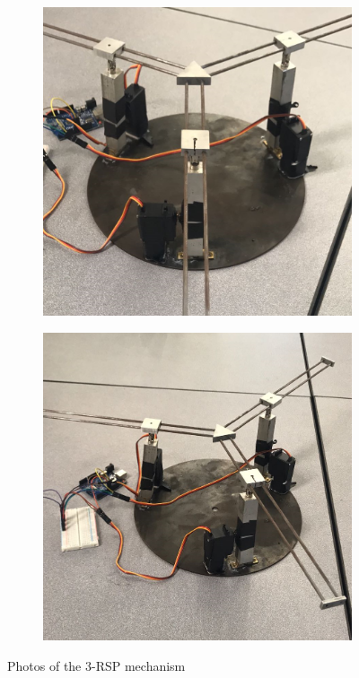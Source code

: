 \documentclass[titlepage, letterpaper]{article}
\begin{document}
\begin{figure}[htbp]
\begin{subfigure}[b]{0.4\textwidth}
    \end{subfigure}
    \begin{subfigure}[b]{0.4\textwidth}
        \includegraphics[width=\linewidth]{photo03}
    \end{subfigure}
    \begin{subfigure}[b]{0.4\textwidth}
        \includegraphics[width=\linewidth]{photo04}
    \end{subfigure}
    \caption{Photos of the 3-RSP mechanism}
    \label{fig:prototype}
\end{figure}
\end{document}
